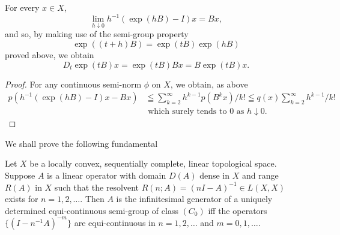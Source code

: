 \begin{corollary}\label{cor:IX.6.Corollary.3} For every $x \in X$, 
\begin{equation}\label{eq:IX.6.4}
\lim\limits _{h \downarrow 0} h ^{-1} (\exp (h B) - I) x = B x,
\end{equation}
and so, by making use of the semi-group property 
\begin{equation}\label{eq:IX.6.5}
\exp ((t + h) B) = \exp (t B) \exp (h B)
\end{equation}
proved above, we obtain 
\begin{equation}\label{eq:IX.6.6}
D _{t} \exp (t B) x = \exp (t B) B x = B \exp (t B) x.
\end{equation}
\end{corollary}

\begin{proof}
 For any continuous semi-norm $\phi$ on $X$, we obtain, as above 
\[
\begin{aligned}
p (h ^{-1} (\exp (h B) - I) x - B x)& \leqq \sum\limits_{k=2} ^{\infty} h ^{k-1} p (B ^{k} x) / k! \leqq q (x) \sum\limits_{k=2} ^{\infty} h ^{k-1} / k!
\\
& \text{ which surely tends to } 0 \text{ as } h \downarrow 0. \end{aligned}
\]
\end{proof}


\label{sec:IX.7}

We shall prove the following fundamental 

\begin{theoremu} Let $X$ be a locally convex, sequentially complete, linear topological space. Suppose $A$ is a linear operator with domain $D(A)$ dense in $X$ and range $R(A)$ in $X$ such that the resolvent $R(n; A) = (nI - A)^{-1} \in L(X, X)$ exists for $n = 1, 2, \ldots$. Then $A$ is the infinitesimal generator of a uniquely determined equi-continuous semi-group of class $(C_0)$ iff the operators $\{(I - n^{-1}A)^{-m}\}$ are equi-continuous in $n = 1, 2, \ldots$ and $m = 0, 1, \ldots$. 
\end{theoremu}

